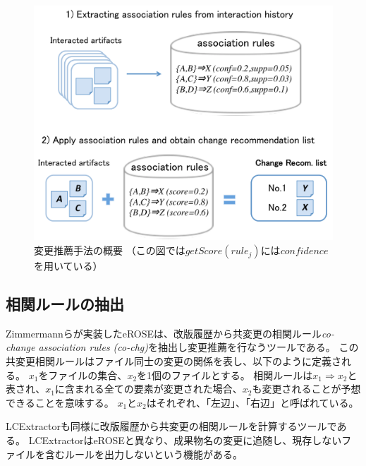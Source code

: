 \documentclass[a4paper]{jsbook}
\def\Ra{\Rightarrow}
\newcommand{\confidence}{con\!f\!idence}
\newcommand{\getScore}{getS\!core}
\begin{document}
\begin{figure}[tb]
  \centering
  \includegraphics[width = \linewidth]{resource/proposal.pdf}
  \caption{変更推薦手法の概要 （この図では$\getScore(rule_j)$には$\confidence$を用いている）}
  \label{proposal}
\end{figure}

\subsection{相関ルールの抽出}\label{extractrules_sec}
Zimmermannらが実装したeROSE\cite{Zimmermann:2005}は、改版履歴から共変更の相関ルール{\it co-change association rules (co-chg)}を抽出し変更推薦を行なうツールである。
この共変更相関ルールはファイル同士の変更の関係を表し、以下のように定義される。
$x_1$をファイルの集合、$x_2$を1個のファイルとする。
相関ルールは$x_1 \Ra x_2$と表され、$x_1$に含まれる全ての要素が変更された場合、$x_2$も変更されることが予想できることを意味する。
$x_1$と$x_2$はそれぞれ、「左辺」、「右辺」と呼ばれている。

LCExtractor\cite{Hagward:2015,Mori:2015}も同様に改版履歴から共変更の相関ルールを計算するツールである。
LCExtractorはeROSEと異なり、成果物名の変更に追随し、現存しないファイルを含むルールを出力しないという機能がある。
\end{document}

